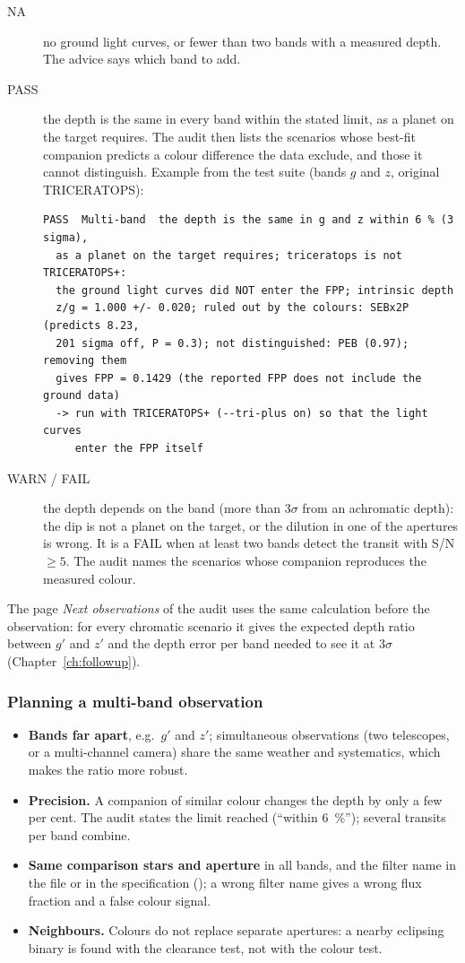 \begin{description}
\item[NA] no ground light curves, or fewer than two bands with a measured
depth. The advice says which band to add.
\item[PASS] the depth is the same in every band within the stated limit,
as a planet on the target requires. The audit then lists the scenarios
whose best-fit companion predicts a colour difference the data exclude,
and those it cannot distinguish. Example from the test suite (bands $g$ and
$z$, original TRICERATOPS):
\begin{lstlisting}
PASS  Multi-band  the depth is the same in g and z within 6 % (3 sigma),
  as a planet on the target requires; triceratops is not TRICERATOPS+:
  the ground light curves did NOT enter the FPP; intrinsic depth
  z/g = 1.000 +/- 0.020; ruled out by the colours: SEBx2P (predicts 8.23,
  201 sigma off, P = 0.3); not distinguished: PEB (0.97); removing them
  gives FPP = 0.1429 (the reported FPP does not include the ground data)
  -> run with TRICERATOPS+ (--tri-plus on) so that the light curves
     enter the FPP itself
\end{lstlisting}
\item[WARN / FAIL] the depth depends on the band (more than 3$\sigma$ from
an achromatic depth): the dip is not a planet on the target, or the
dilution in one of the apertures is wrong. It is a FAIL when at least two
bands detect the transit with S/N $\geq 5$. The audit names the scenarios
whose companion reproduces the measured colour.
\end{description}

The page \emph{Next observations} of the audit uses the same calculation
before the observation: for every chromatic scenario it gives the expected
depth ratio between $g'$ and $z'$ and the depth error per band needed to
see it at 3$\sigma$ (Chapter~\ref{ch:followup}).

\subsubsection*{Planning a multi-band observation}

\begin{itemize}
\item \textbf{Bands far apart}, e.g.\ $g'$ and $z'$; simultaneous
observations (two telescopes, or a multi-channel camera) share the same
weather and systematics, which makes the ratio more robust.
\item \textbf{Precision.} A companion of similar colour changes the depth
by only a few per cent. The audit states the limit reached (``within
6~\%''); several transits per band combine.
\item \textbf{Same comparison stars and aperture} in all bands, and the
filter name in the file or in the specification (); a
wrong filter name gives a wrong flux fraction and a false colour signal.
\item \textbf{Neighbours.} Colours do not replace separate apertures: a
nearby eclipsing binary is found with the clearance test, not with the
colour test.
\end{itemize}
